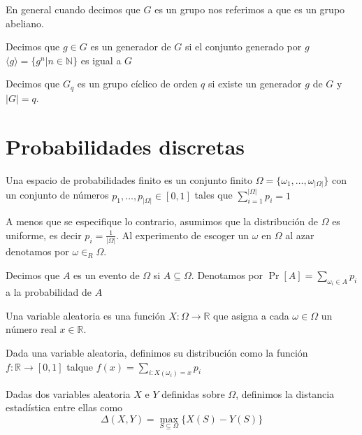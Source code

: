 En general cuando decimos que $G$ es un grupo nos referimos a que es un grupo abeliano.

\begin{definicion}[Generador]
Decimos que $g\in G$ es un generador de $G$ si el conjunto generado por $g$ 
$\langle g \rangle = \{g^n|n\in\mathbb{N}\}$ es igual a $G$
\end{definicion}

\begin{definicion}
Decimos que $G_q$ es un grupo cíclico de orden $q$ si existe un generador
$g$ de $G$ y $|G| = q$.

\end{definicion}

\section{Probabilidades discretas}

\begin{definicion}
Una espacio de probabilidades finito es un conjunto finito
$\Omega = \{\omega_1, \ldots, \omega_{|\Omega|}\}$ con un conjunto
de números $p_1, \ldots, p_{|\Omega|} \in [0,1]$ tales que
$\sum_{i=1}^{|\Omega|}p_i=1$
\end{definicion}

A menos que se especifique lo contrario, asumimos que la distribución
de $\Omega$ es uniforme, es decir $p_i = \frac{1}{|\Omega|}$. Al experimento
de escoger un $\omega$ en $\Omega$ al azar denotamos por $\omega \in_R \Omega$.

\begin{definicion}[Evento]
Decimos que $A$ es un evento de $\Omega$ si $A \subseteq \Omega$. Denotamos
por $\Pr[A] = \sum_{\omega_i \in A}p_i$  a la probabilidad de $A$
\end{definicion}

\begin{definicion}
Una variable aleatoria es una función $X:\Omega \to \mathbb{R}$ que asigna a
cada $\omega \in \Omega$ un número real $x \in \mathbb{R}$.
\end{definicion}

\begin{definicion}[Distribución]
Dada una variable aleatoria, definimos su distribución como la función
$f:\mathbb{R} \to [0,1]$ talque $f(x) = \sum_{i:X(\omega_i)=x}p_i$
\end{definicion}

\begin{definicion}
Dadas dos variables aleatoria $X$ e $Y$ definidas sobre $\Omega$, definimos
la distancia estadística entre ellas como
$$\Delta(X, Y) = \max_{S\subseteq \Omega}\{X(S)-Y(S)\}$$
\end{definicion}

